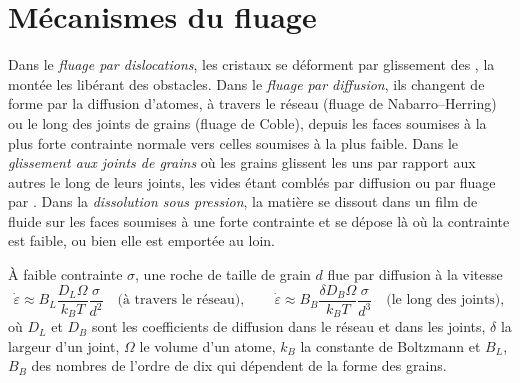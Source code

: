 \section{Mécanismes du fluage}

\begin{definition}\label{def:b3:deformation-mechanisms:creep}
Dans le \emph{fluage par dislocations}, les cristaux se déforment par
glissement des , la montée les libérant des obstacles. Dans le
\emph{fluage par diffusion}, ils changent de forme par la diffusion
d'atomes, à travers le réseau (fluage de Nabarro--Herring) ou le long des
joints de grains (fluage de Coble), depuis les faces soumises à la plus forte contrainte normale
vers celles soumises à la plus faible. Dans le \emph{glissement aux joints de grains}
où les grains glissent les uns par rapport aux autres le long de leurs joints, les vides étant
comblés par diffusion ou par fluage par . Dans la \emph{dissolution sous
pression}, la matière se dissout dans un film de fluide sur les
faces soumises à une forte contrainte et se dépose là où la contrainte est faible, ou bien
elle est emportée au loin.
\end{definition}

\begin{proposition}\label{prop:b3:deformation-mechanisms:grain-size}
À faible contrainte $\sigma$, une roche de taille de grain $d$ flue par diffusion à la vitesse
\[
  \dot\varepsilon \approx B_L\frac{D_L\Omega}{k_BT}\frac{\sigma}{d^2}
  \quad\text{(à travers le réseau)},\qquad
  \dot\varepsilon \approx B_B\frac{\delta D_B\Omega}{k_BT}\frac{\sigma}{d^3}
  \quad\text{(le long des joints)},
\]
où $D_L$ et $D_B$ sont les coefficients de diffusion dans le réseau et dans les
joints, $\delta$ la largeur d'un joint, $\Omega$ le volume d'un atome,
$k_B$ la constante de Boltzmann et $B_L$, $B_B$ des nombres de l'ordre de dix qui dépendent de
la forme des grains.
\end{proposition}

